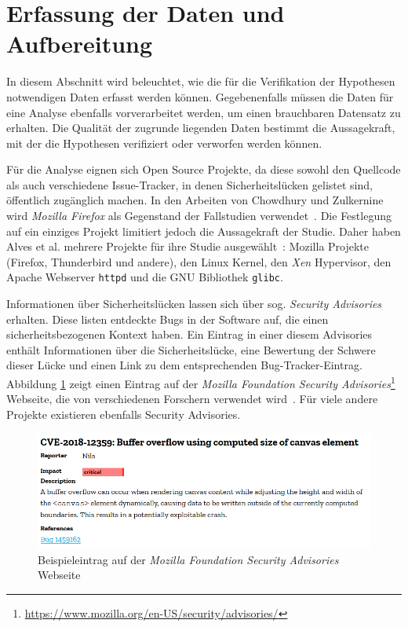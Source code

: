 \section{Erfassung der Daten und Aufbereitung}
\label{sec:erfassung}
In diesem Abschnitt wird beleuchtet, wie die für die Verifikation der Hypothesen notwendigen Daten erfasst werden können.
Gegebenenfalls müssen die Daten für eine Analyse ebenfalls vorverarbeitet werden, um einen brauchbaren Datensatz zu erhalten.
Die Qualität der zugrunde liegenden Daten bestimmt die Aussagekraft, mit der die Hypothesen verifiziert oder verworfen werden können.

Für die Analyse eignen sich Open Source Projekte,
da diese sowohl den Quellcode als auch verschiedene Issue-Tracker,
in denen Sicherheitslücken gelistet sind,
öffentlich zugänglich machen.
In den Arbeiten von Chowdhury und Zulkernine wird \emph{Mozilla Firefox} als Gegenstand der Fallstudien verwendet~\cite{chowdhury_zulkernine_2010,chowdhury_zulkernine_2009}.
Die Festlegung auf ein einziges Projekt limitiert jedoch die Aussagekraft der Studie.
Daher haben Alves et al. mehrere Projekte für ihre Studie ausgewählt~\cite{alves_et_al}: 
Mozilla Projekte (Firefox, Thunderbird und andere),
den Linux Kernel,
den \emph{Xen} Hypervisor,
den Apache Webserver \texttt{httpd} und
die GNU Bibliothek \texttt{glibc}.

Informationen über Sicherheitslücken lassen sich über sog. \emph{Security Advisories} erhalten.
Diese listen entdeckte Bugs in der Software auf, die einen sicherheitsbezogenen Kontext haben.
Ein Eintrag in einer diesem Advisories enthält Informationen über die Sicherheitslücke, eine Bewertung der Schwere dieser Lücke und einen Link zu dem entsprechenden Bug-Tracker-Eintrag.
Abbildung \ref{fig:mfsa} zeigt einen Eintrag auf der \textit{Mozilla Foundation Security Advisories}\footnote{\url{https://www.mozilla.org/en-US/security/advisories/}} Webseite, die von verschiedenen Forschern verwendet wird~\cite{alves_et_al,chowdhury_zulkernine_2010}.
Für viele andere Projekte existieren ebenfalls Security Advisories.
\begin{figure}
	\includegraphics[width=\textwidth]{img/mfsa_example.png}
	\caption{Beispieleintrag auf der \textit{Mozilla Foundation Security Advisories} Webseite}
	\label{fig:mfsa}
\end{figure}

